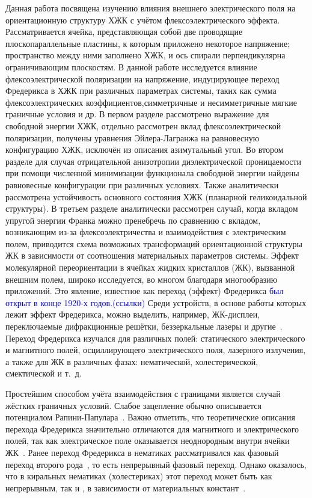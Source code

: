 Данная работа посвящена изучению влияния внешнего электрического поля на ориентационную структуру ХЖК с учётом флексоэлектрического эффекта.
Рассматривается ячейка, представляющая собой две проводящие плоскопараллельные пластины, к которым приложено некоторое напряжение; пространство между ними заполнено ХЖК, и ось спирали перпендикулярна ограничивающим плоскостям.
В данной работе исследуется влияние флексоэлектрической поляризации на напряжение, индуцирующее переход Фредерикса в ХЖК при различных параметрах системы, таких как сумма флексоэлектрических коэффициентов,симметричные и несимметричные мягкие граничные условия и др. В первом разделе рассмотрено выражение для свободной энергии ХЖК, отдельно рассмотрен вклад флексоэлектрической поляризации, получены уравнения Эйлера-Лагранжа на равновесную конфигурацию ХЖК, исключён из описания азимутальный угол.
Во втором разделе для случая отрицательной анизотропии диэлектрической проницаемости при помощи численной минимизации функционала свободной энергии найдены равновесные конфигурации при различных условиях.
Также аналитически рассмотрена устойчивость основного состояния ХЖК (планарной геликоидальной структуры).
В третьем разделе аналитически рассмотрен случай, когда вкладом упругой энергии Франка можно пренебречь по сравнению с вкладом, возникающим из-за флексоэлектричества и взаимодействия с электрическим полем, приводится схема возможных трансформаций ориентационной структуры ЖК в зависимости от соотношения материальных параметров системы.
Эффект молекулярной переориентации в ячейках жидких кристаллов (ЖК), вызванной внешним полем, широко исследуется, во многом благодаря многообразию приложений.
Это явление, известное как переход (эффект) Фредерикса \textcolor{blue}{был открыт в конце 1920-х годов.(ссылки)}
Среди устройств, в основе работы которых лежит эффект Фредерикса, можно выделить, например, ЖК-дисплеи, переключаемые дифракционные решётки, беззеркальные лазеры и другие~\autocite{YangWu2014}. 
Переход Фредерикса изучался для различных полей: статического электрического и магнитного полей, осциллирующего электрического поля, лазерного излучения, а также для ЖК в различных фазах: нематической, холестерической, смектической и т.~д.~\autocite{Blinov1994,deGennesbook1995,stewartBook}

Простейшим способом учёта взаимодействия с границами является случай жёстких граничных условий.
Слабое зацепление обычно описывается потенциалом Рапини-Папулара~\autocite{Rapini69}.
Важно отметить, что теоретические описания перехода Фредерикса значительно отличаются для магнитного и электрического полей, так как электрическое поле оказывается неоднородным внутри ячейки ЖК~\autocite{Deuling,NonHomoElectricField1972,CTBerr,Arakelyan1984,Napoli2006}.
Ранее переход Фредерикса в нематиках рассматривался как фазовый переход второго рода~\autocite{Guyon1975}, то есть непрерывный фазовый переход.
Однако оказалось, что в киральных нематиках (холестериках) этот переход может быть как непрерывным, так и , в зависимости от материальных констант~\autocite{VAR2013}.

